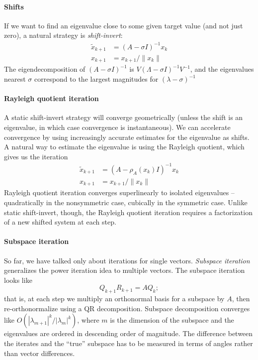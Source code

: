 \documentclass[12pt, leqno]{article}
\begin{document}
\paragraph{Shifts}
If we want to find an eigenvalue close to some given target value
(and not just zero), a natural strategy is {\em shift-invert}:
\begin{align*}
  \tilde{x}_{k+1} &= (A-\sigma I)^{-1} x_k \\
  x_{k+1} &= x_{k+1}/\|x_k\|
\end{align*}
The eigendecomposition of $(A-\sigma I)^{-1}$ is
$V (\Lambda - \sigma I)^{-1} V^{-1}$, and the eigenvalues
nearest $\sigma$ correspond to the
largest magnitudes for $(\lambda-\sigma)^{-1}$

\paragraph{Rayleigh quotient iteration}
A static shift-invert strategy will converge geometrically (unless the
shift is an eigenvalue, in which case convergence is instantaneous).
We can accelerate convergence by using increasingly accurate estimates
for the eigenvalue as shifts.  A natural way to estimate the
eigenvalue is using the Rayleigh quotient, which gives us the iteration
\begin{align*}
  \tilde{x}_{k+1} &= (A-\rho_A(x_k) I)^{-1} x_k \\
  x_{k+1} &= x_{k+1}/\|x_k\|
\end{align*}
Rayleigh quotient iteration converges superlinearly to isolated
eigenvalues -- quadratically in the nonsymmetric case, cubically in
the symmetric case.  Unlike static shift-invert, though, the Rayleigh
quotient iteration requires a factorization of a new shifted system
at each step.

\paragraph{Subspace iteration}
So far, we have talked only about iterations for single vectors.
{\em Subspace iteration} generalizes the power iteration idea to
multiple vectors.  The subspace iteration looks like
\[
  Q_{k+1} R_{k+1} = A Q_{k};
\]
that is, at each step we multiply an orthonormal basis for a subspace
by $A$, then re-orthonormalize using a QR decomposition.  Subspace
decomposition converges like $O(|\lambda_{m+1}|^k/|\lambda_{m}|^k)$,
where $m$ is the dimension of the subspace and the eigenvalues are
ordered in descending order of magnitude.  The difference between the
iterates and the ``true'' subspace has to be measured in terms of
angles rather than vector differences.
\end{document}
